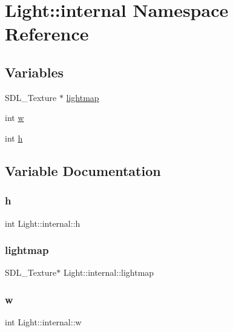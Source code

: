 \hypertarget{namespace_light_1_1internal}{}\section{Light\+:\+:internal Namespace Reference}
\label{namespace_light_1_1internal}
\subsection*{Variables}
\begin{DoxyCompactItemize}
\item 
S\+D\+L\+\_\+\+Texture $\ast$ \mbox{\hyperlink{namespace_light_1_1internal_a5f268221016136c108abefe522f6c0f0}{lightmap}}
\item 
int \mbox{\hyperlink{namespace_light_1_1internal_a9a7e6669dc68a160ac01eb776ef71b76}{w}}
\item 
int \mbox{\hyperlink{namespace_light_1_1internal_a768d5dc222005d293a29c90d560247f0}{h}}
\end{DoxyCompactItemize}


\subsection{Variable Documentation}
\mbox{\label{namespace_light_1_1internal_a768d5dc222005d293a29c90d560247f0}} 
\subsubsection{\texorpdfstring{h}{h}}
{\footnotesize\ttfamily int Light\+::internal\+::h}

\mbox{\label{namespace_light_1_1internal_a5f268221016136c108abefe522f6c0f0}} 
\subsubsection{\texorpdfstring{lightmap}{lightmap}}
{\footnotesize\ttfamily S\+D\+L\+\_\+\+Texture$\ast$ Light\+::internal\+::lightmap}

\mbox{\label{namespace_light_1_1internal_a9a7e6669dc68a160ac01eb776ef71b76}} 
\subsubsection{\texorpdfstring{w}{w}}
{\footnotesize\ttfamily int Light\+::internal\+::w}

